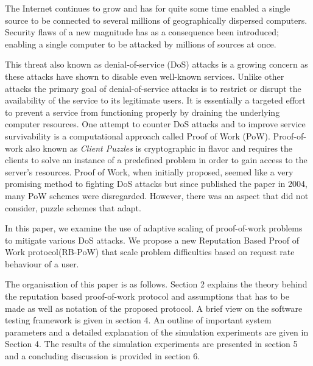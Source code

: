 The Internet continues to grow and has for quite some time enabled a single source to be connected to several millions of geographically dispersed computers. Security flaws of a new magnitude has as a consequence been introduced; enabling a single computer to be attacked by millions of sources at once. 

This threat also known as denial-of-service (DoS) attacks is a growing concern as these attacks have shown to disable even well-known services. Unlike other attacks the primary goal of denial-of-service attacks is to restrict or disrupt the availability of the service to its legitimate users. It is essentially a targeted effort to prevent a service from functioning properly by draining the underlying computer resources. 
One attempt to counter DoS attacks and to improve service survivability is a computational approach called Proof of Work (PoW). Proof-of-work also known as \emph{Client Puzzles}\cite{dosauth, JuelsB99} is cryptographic in flavor and requires the clients to solve an instance of a predefined problem in order to gain access to the server’s resources. Proof of Work, when initially proposed, seemed like a very promising method to fighting DoS attacks but since \citeauthor{LaurieC04} published the paper  in 2004, many PoW schemes were disregarded. However, there was an aspect that \citeauthor{LaurieC04} did not consider, puzzle schemes that adapt\cite{Green,gunter}.

In this paper, we examine the use of adaptive scaling of proof-of-work problems to mitigate various DoS attacks. We propose a new Reputation Based Proof of Work protocol(RB-PoW) that scale problem difficulties based on request rate behaviour of a user.

The organisation of this paper is as follows. Section 2 explains the theory behind the reputation based proof-of-work protocol and assumptions that has to be made as well as notation of the proposed protocol. A brief view on the software testing framework is given in section 4.
An outline of important system parameters and a detailed explanation of the simulation experiments are given in Section 4. The results of the simulation experiments are presented in section 5 and a concluding discussion is provided in section 6.



